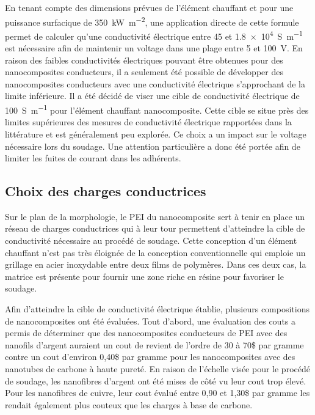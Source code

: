 En tenant compte des dimensions prévues de l'élément chauffant et pour une puissance surfacique de \SI[locale=FR]{350}{\kilo\watt\per\square\metre}, une application directe de cette formule permet de calculer qu'une conductivité électrique entre 45 et \SI[locale=FR]{1,8e4}{\siemens\per\metre} est nécessaire afin de maintenir un voltage dans une plage entre 5 et \SI[locale=FR]{100}{\volt}. 
En raison des faibles conductivités électriques pouvant être obtenues pour des nanocomposites conducteurs, il a seulement été possible de développer des nanocomposites conducteurs avec une conductivité électrique s'approchant de la limite inférieure. 
Il a été décidé de viser une cible de conductivité électrique de \SI[locale=FR]{100}{\siemens\per\metre} pour l'élément chauffant nanocomposite. 
Cette cible se situe près des limites supérieures des mesures de conductivité électrique rapportées dans la littérature et est généralement peu explorée. 
Ce choix a un impact sur le voltage nécessaire lors du soudage.
Une attention particulière a donc été portée afin de limiter les fuites de courant dans les adhérents. 

\subsection{Choix des charges conductrices}

Sur le plan de la morphologie, le PEI du nanocomposite sert à tenir en place un réseau de charges conductrices qui à leur tour permettent d'atteindre la cible de conductivité nécessaire au procédé de soudage. 
Cette conception d'un élément chauffant n'est pas très éloignée de la conception conventionnelle qui emploie un grillage en acier inoxydable entre deux films de polymères. 
Dans ces deux cas, la matrice est présente pour fournir une zone riche en résine pour favoriser le soudage. 

Afin d'atteindre la cible de conductivité électrique établie, plusieurs compositions de nanocomposites ont été évaluées. 
Tout d'abord, une évaluation des couts a permis de déterminer que des nanocomposites conducteurs de PEI avec des nanofils d'argent auraient un cout de revient de l'ordre de 30 à 70\$ par gramme contre un cout d'environ 0,40\$ par gramme pour les nanocomposites avec des nanotubes de carbone à haute pureté. 
En raison de l'échelle visée pour le procédé de soudage, les nanofibres d'argent ont été mises de côté vu leur cout trop élevé. 
Pour les nanofibres de cuivre, leur cout évalué entre 0,90 et 1,30\$ par gramme les rendait également plus couteux que les charges à base de carbone. 

